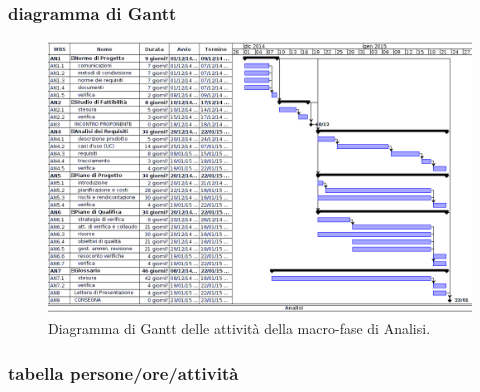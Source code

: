 \newpage
\subsubsection{diagramma di Gantt}

\begin{figure}[h]
\begin{center}
\includegraphics[width=\textwidth, height=\textheight, keepaspectratio]{img/analisi-gantt.png}
\caption{Diagramma di Gantt delle attività della macro-fase di Analisi.}
\end{center}
\end{figure}
\clearpage

\newpage
\subsubsection{tabella persone/ore/attività}

